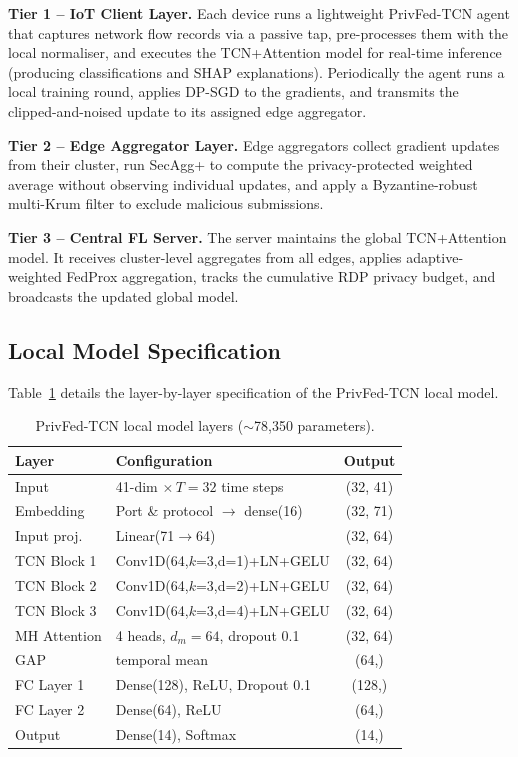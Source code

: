 \documentclass[conference]{IEEEtran}
\begin{document}
\textbf{Tier 1 -- IoT Client Layer.} Each device runs a lightweight
PrivFed-TCN agent that captures network flow records via a passive
tap, pre-processes them with the local normaliser, and executes the
TCN+Attention model for real-time inference (producing classifications
and SHAP explanations). Periodically the agent runs a local training
round, applies DP-SGD to the gradients, and transmits the
clipped-and-noised update to its assigned edge aggregator.

\textbf{Tier 2 -- Edge Aggregator Layer.} Edge aggregators collect
gradient updates from their cluster, run SecAgg+ to compute the
privacy-protected weighted average without observing individual
updates, and apply a Byzantine-robust multi-Krum filter to exclude
malicious submissions.

\textbf{Tier 3 -- Central FL Server.} The server maintains the global
TCN+Attention model. It receives cluster-level aggregates from all
edges, applies adaptive-weighted FedProx aggregation, tracks the
cumulative RDP privacy budget, and broadcasts the updated global
model.

\subsection{Local Model Specification}
Table~\ref{tab:model} details the layer-by-layer specification of the
PrivFed-TCN local model.

\begin{table}[t]
\centering
\caption{PrivFed-TCN local model layers ($\sim$78,350 parameters).}
\label{tab:model}
\renewcommand{\arraystretch}{1.10}
\begin{tabular}{p{} p{} c}
\toprule
\textbf{Layer} & \textbf{Configuration} & \textbf{Output} \\
\midrule
Input          & 41-dim $\times\,T\!=\!32$ time steps & (32, 41) \\
Embedding      & Port \& protocol $\to$ dense(16)     & (32, 71) \\
Input proj.    & Linear(71$\to$64)                    & (32, 64) \\
TCN Block 1    & Conv1D(64,$k$=3,d=1)+LN+GELU         & (32, 64) \\
TCN Block 2    & Conv1D(64,$k$=3,d=2)+LN+GELU         & (32, 64) \\
TCN Block 3    & Conv1D(64,$k$=3,d=4)+LN+GELU         & (32, 64) \\
MH Attention   & 4 heads, $d_{m}\!=\!64$, dropout 0.1 & (32, 64) \\
GAP            & temporal mean                        & (64,)    \\
FC Layer 1     & Dense(128), ReLU, Dropout 0.1        & (128,)   \\
FC Layer 2     & Dense(64), ReLU                      & (64,)    \\
Output         & Dense(14), Softmax                   & (14,)    \\
\bottomrule
\end{tabular}
\end{table}
\end{document}
